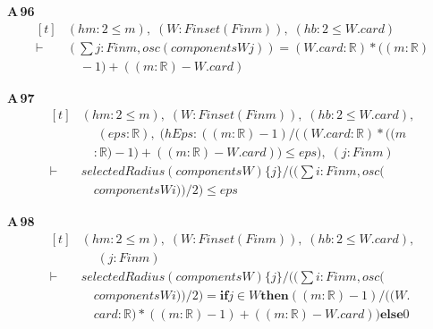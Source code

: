 \noindent\textbf{A\,96}\quad{}
{\footnotesize\[ \begin{aligned}[t]
&(\mathit{hm} : 2 \leq \mathit{m}),\; (\mathit{W} : \mathit{Finset} (\mathit{Fin} \mathit{m})),\; (\mathit{hb} : 2 \leq \mathit{W}.\mathit{card})\\
\vdash\;&(\textstyle\sum \mathit{j} : \mathit{Fin} \mathit{m}, \mathit{osc} (\mathit{components} \mathit{W} \mathit{j})) = (\mathit{W}.\mathit{card} : \mathbb{R} )*((\mathit{m}:\mathbb{R} )\\
&\quad -1) + ((\mathit{m}:\mathbb{R} ) - \mathit{W}.\mathit{card})
\end{aligned} \]}

\noindent\textbf{A\,97}\quad{}
{\footnotesize\[ \begin{aligned}[t]
&(\mathit{hm} : 2 \leq \mathit{m}),\; (\mathit{W} : \mathit{Finset} (\mathit{Fin} \mathit{m})),\; (\mathit{hb} : 2 \leq \mathit{W}.\mathit{card}),\\
&\quad \; (\mathit{eps} : \mathbb{R} ),\; (\mathit{hEps} : ((\mathit{m}:\mathbb{R} )-1)/((\mathit{W}.\mathit{card}:\mathbb{R} )*((\mathit{m}\\
&\quad :\mathbb{R} )-1) + ((\mathit{m}:\mathbb{R} ) - \mathit{W}.\mathit{card})) \leq \mathit{eps}),\; (\mathit{j} : \mathit{Fin} \mathit{m})\\
\vdash\;&\mathit{selectedRadius} (\mathit{components} \mathit{W}) \{ \mathit{j}\} / ((\textstyle\sum \mathit{i} : \mathit{Fin} \mathit{m}, \mathit{osc} (\\
&\quad \mathit{components} \mathit{W} \mathit{i}))/2) \leq \mathit{eps}
\end{aligned} \]}

\noindent\textbf{A\,98}\quad{}
{\footnotesize\[ \begin{aligned}[t]
&(\mathit{hm} : 2 \leq \mathit{m}),\; (\mathit{W} : \mathit{Finset} (\mathit{Fin} \mathit{m})),\; (\mathit{hb} : 2 \leq \mathit{W}.\mathit{card}),\\
&\quad \; (\mathit{j} : \mathit{Fin} \mathit{m})\\
\vdash\;&\mathit{selectedRadius} (\mathit{components} \mathit{W}) \{ \mathit{j}\} / ((\textstyle\sum \mathit{i} : \mathit{Fin} \mathit{m}, \mathit{osc} (\\
&\quad \mathit{components} \mathit{W} \mathit{i}))/2) = \mathbf{if} \mathit{j} \in \mathit{W} \mathbf{then} ((\mathit{m}:\mathbb{R} )-1)/((\mathit{W}.\\
&\quad \mathit{card}:\mathbb{R} )*((\mathit{m}:\mathbb{R} )-1) + ((\mathit{m}:\mathbb{R} ) - \mathit{W}.\mathit{card})) \mathbf{else} 0
\end{aligned} \]}

